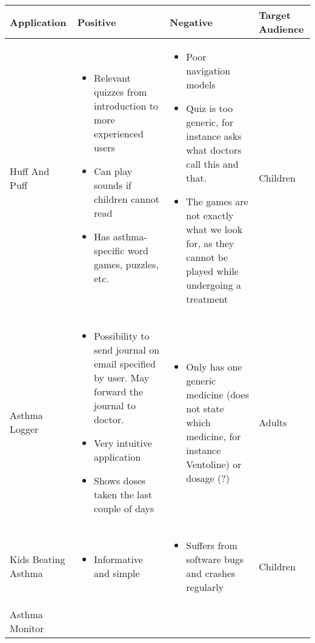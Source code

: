 \begin{sidewaystable}
	\label{tab:existing-product-table}
	\begin{tabular}{ | p{4.0cm} | p{5.5cm} | p{5.5cm} | p{4cm}|}
	\hline
	\textbf{Application} & \textbf{Positive} & \textbf{Negative} & \textbf{Target Audience} \\ \hline
	
   Huff And Puff 
	& 
	\begin{itemize}
	  \item Relevant quizzes from introduction to more experienced users
	  \item Can play sounds if children cannot read
	  \item Has asthma-specific word games, puzzles, etc.  
	\end{itemize}
	&
	\begin{itemize}
	  \item Poor navigation models
	  \item Quiz is too generic, for instance asks what doctors call this and that.
	  \item The games are not exactly what we look for, as they cannot be played while undergoing a treatment  
	\end{itemize}
	&
	Children
	\\ \hline
	Asthma Logger
	& 
	\begin{itemize}
	  \item Possibility to send journal on email specified by user. May forward the journal to doctor.  
	  \item Very intuitive application
	  \item Shows doses taken the last couple of days
	\end{itemize}
	& 
	\begin{itemize}
	  \item Only has one generic medicine (does not state which medicine, for instance Ventoline) or dosage (?) 
	\end{itemize}
	& 
	Adults
	\\ \hline
	Kids Beating Asthma
	& 
	\begin{itemize}
	  \item Informative and simple
	\end{itemize}
	&
	\begin{itemize}
	  \item Suffers from software bugs and crashes regularly
	\end{itemize}
	& Children
	\\ \hline
	Asthma Monitor

\end{tabular}
\end{sidewaystable}
